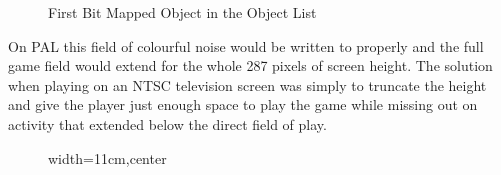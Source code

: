\begin{figure}[H]
{
  }\caption{First Bit Mapped Object in the Object List}
\end{figure}

On PAL this field of colourful noise would be written to properly and the full game field would
extend for the whole 287 pixels of screen height. The solution when playing on an NTSC television
screen was simply to truncate the height and give the player just enough space to play the game
while missing out on activity that extended below the direct field of play.

\begin{figure}[H]
    \centering
    \begin{adjustbox}{width=11cm,center}
    \end{adjustbox}
\end{figure}

